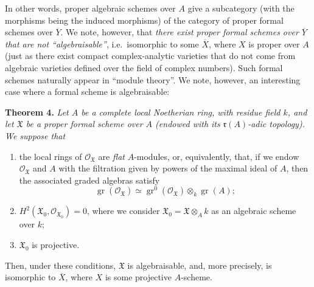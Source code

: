 \documentclass{article}
\newenvironment{itenv}[1]
  {\phantomsection\par\smallskip\noindent\textbf{#1.}\itshape}
  {\par\smallskip}
\newcommand{\oldpage}[1]{\marginpar{\footnotesize$\Big\vert$ \textit{p.~#1}}}
\theoremstyle{definition}
\theoremstyle{definition}
\theoremstyle{definition}
\theoremstyle{definition}
\theoremstyle{remark}
\begin{document}
In other words, proper algebraic schemes over \(A\) give a subcategory (with the morphisms being the induced morphisms) of the category of proper formal schemes over \(\overline{Y}\).
We note, however, that \emph{there exist proper formal schemes over \(\overline{Y}\) that are not ``algebraisable''}, i.e.~isomorphic to some \(\overline{X}\), where \(X\) is proper over \(A\) (just as there exist compact complex-analytic varieties that do not come from algebraic varieties defined over the field of complex numbers).
Such formal schemes naturally appear in ``module theory''.
We note, however, an interesting case where a formal scheme is algebraisable:

\leavevmode{}%
\begin{itenv}{Theorem 4}
Let \(A\) be a complete local Noetherian ring, with residue field \(k\), and let \({\mathfrak{X}}\) be a proper formal scheme over \(A\) (endowed with its \({\mathfrak{r}}(A)\)-adic topology).
We suppose that

\begin{enumerate}
\def\labelenumi{\roman{enumi}.}
\item
  the local rings of \({\mathscr{O}}_{{\mathfrak{X}}}\) are \emph{flat} \(A\)-modules, or, equivalently, that, if we endow \({\mathscr{O}}_{{\mathfrak{X}}}\) and \(A\) with the filtration given by powers of the maximal ideal of \(A\), then the associated graded algebras satisfy
  \[
   \operatorname{gr}({\mathscr{O}}_{{\mathfrak{X}}}) \simeq \operatorname{gr}^0({\mathscr{O}}_{{\mathfrak{X}}})\otimes_k\operatorname{gr}(A);
    \]
\item
  \(H^2({\mathfrak{X}}_0,{\mathscr{O}}_{{\mathfrak{X}}_0})=0\), where we consider \({\mathfrak{X}}_0={\mathfrak{X}}\otimes_Ak\) as an algebraic scheme over \(k\);
\item
  \({\mathfrak{X}}_0\) is projective.
\end{enumerate}

\oldpage{182-07}Then, under these conditions, \({\mathfrak{X}}\) is algebraisable, and, more precisely, is isomorphic to \(\overline{X}\), where \(X\) is some projective \(A\)-scheme.

\end{itenv}
\end{document}

